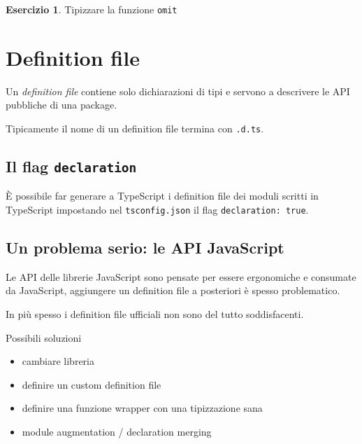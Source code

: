 \documentclass[12pt]{article}
\theoremstyle{definition}
\newtheorem{exercise}{Esercizio}[subsection]
\begin{document}
\begin{exercise}
Tipizzare la funzione \texttt{omit}
\end{exercise}

\newpage
\section{Definition file}

Un \emph{definition file} contiene solo dichiarazioni di tipi e servono a descrivere le API pubbliche di una package.

Tipicamente il nome di un definition file termina con \texttt{.d.ts}.

\subsection{Il flag \texttt{declaration}}

È possibile far generare a TypeScript i definition file dei moduli scritti in TypeScript impostando nel \texttt{tsconfig.json}
il flag \texttt{declaration: true}.

\subsection{Un problema serio: le API JavaScript}

Le API delle librerie JavaScript sono pensate per essere ergonomiche e consumate da JavaScript,
aggiungere un definition file a posteriori è spesso problematico.

In più spesso i definition file ufficiali non sono del tutto soddisfacenti.

Possibili soluzioni

\begin{itemize}
\item cambiare libreria
\item definire un custom definition file
\item definire una funzione wrapper con una tipizzazione sana
\item module augmentation / declaration merging
\end{itemize}
\end{document}
